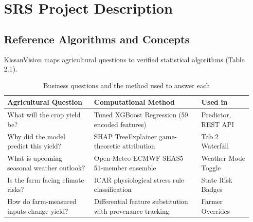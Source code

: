 \documentclass[11pt,a4paper]{report}
\begin{document}
\chapter{SRS Project Description}

\section{Reference Algorithms and Concepts}
KissanVision maps agricultural questions to verified statistical algorithms (Table 2.1).

\begin{table}[htbp]
\centering
\small
\caption{Business questions and the method used to answer each}
\begin{tabularx}{\textwidth}{lXX}
\toprule
\textbf{Agricultural Question} & \textbf{Computational Method} & \textbf{Used in} \\
\midrule
What will the crop yield be? & Tuned XGBoost Regression (59 encoded features) & Predictor, REST API \\
Why did the model predict this yield? & SHAP TreeExplainer game-theoretic attribution & Tab 2 Waterfall \\
What is upcoming seasonal weather outlook? & Open-Meteo ECMWF SEAS5 51-member ensemble & Weather Mode Toggle \\
Is the farm facing climate risks? & ICAR physiological stress rule classification & State Risk Badges \\
How do farm-measured inputs change yield? & Differential feature substitution with provenance tracking & Farmer Overrides \\
\bottomrule
\end{tabularx}
\end{table}
\end{document}
